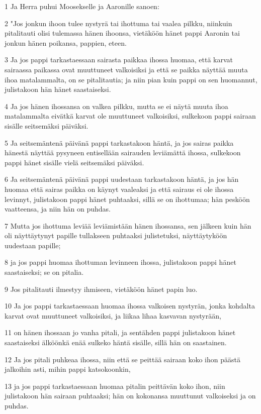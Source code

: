 \par 1 Ja Herra puhui Moosekselle ja Aaronille sanoen:
\par 2 "Jos jonkun ihoon tulee nystyrä tai ihottuma tai vaalea pilkku, niinkuin pitalitauti olisi tulemassa hänen ihoonsa, vietäköön hänet pappi Aaronin tai jonkun hänen poikansa, pappien, eteen.
\par 3 Ja jos pappi tarkastaessaan sairasta paikkaa ihossa huomaa, että karvat sairaassa paikassa ovat muuttuneet valkoisiksi ja että se paikka näyttää muuta ihoa matalammalta, on se pitalitautia; ja niin pian kuin pappi on sen huomannut, julistakoon hän hänet saastaiseksi.
\par 4 Ja jos hänen ihossansa on valkea pilkku, mutta se ei näytä muuta ihoa matalammalta eivätkä karvat ole muuttuneet valkoisiksi, sulkekoon pappi sairaan sisälle seitsemäksi päiväksi.
\par 5 Ja seitsemäntenä päivänä pappi tarkastakoon häntä, ja jos sairas paikka hänestä näyttää pysyneen entisellään sairauden leviämättä ihossa, sulkekoon pappi hänet sisälle vielä seitsemäksi päiväksi.
\par 6 Ja seitsemäntenä päivänä pappi uudestaan tarkastakoon häntä, ja jos hän huomaa että sairas paikka on käynyt vaaleaksi ja että sairaus ei ole ihossa levinnyt, julistakoon pappi hänet puhtaaksi, sillä se on ihottumaa; hän pesköön vaatteensa, ja niin hän on puhdas.
\par 7 Mutta jos ihottuma leviää leviämistään hänen ihossansa, sen jälkeen kuin hän oli näyttäytynyt papille tullakseen puhtaaksi julistetuksi, näyttäytyköön uudestaan papille;
\par 8 ja jos pappi huomaa ihottuman levinneen ihossa, julistakoon pappi hänet saastaiseksi; se on pitalia.
\par 9 Jos pitalitauti ilmestyy ihmiseen, vietäköön hänet papin luo.
\par 10 Ja jos pappi tarkastaessaan huomaa ihossa valkoisen nystyrän, jonka kohdalta karvat ovat muuttuneet valkoisiksi, ja liikaa lihaa kasvavan nystyrään,
\par 11 on hänen ihossaan jo vanha pitali, ja sentähden pappi julistakoon hänet saastaiseksi älköönkä enää sulkeko häntä sisälle, sillä hän on saastainen.
\par 12 Ja jos pitali puhkeaa ihossa, niin että se peittää sairaan koko ihon päästä jalkoihin asti, mihin pappi katsokoonkin,
\par 13 ja jos pappi tarkastaessaan huomaa pitalin peittävän koko ihon, niin julistakoon hän sairaan puhtaaksi; hän on kokonansa muuttunut valkoiseksi ja on puhdas.
